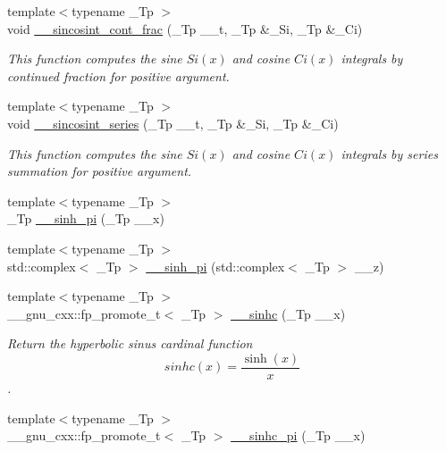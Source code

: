 \begin{DoxyCompactItemize}
{\footnotesize template$<$typename \+\_\+\+Tp $>$ }\\void \hyperlink{namespacestd_1_1____detail_a211f552bca2944f64e3a1f5593690fda}{\+\_\+\+\_\+sincosint\+\_\+cont\+\_\+frac} (\+\_\+\+Tp \+\_\+\+\_\+t, \+\_\+\+Tp \&\+\_\+\+Si, \+\_\+\+Tp \&\+\_\+\+Ci)
\begin{DoxyCompactList}\small\item\em This function computes the sine $ Si(x) $ and cosine $ Ci(x) $ integrals by continued fraction for positive argument. \end{DoxyCompactList}\item 
{\footnotesize template$<$typename \+\_\+\+Tp $>$ }\\void \hyperlink{namespacestd_1_1____detail_aea85e0044476065ed4a067f1aa9647cb}{\+\_\+\+\_\+sincosint\+\_\+series} (\+\_\+\+Tp \+\_\+\+\_\+t, \+\_\+\+Tp \&\+\_\+\+Si, \+\_\+\+Tp \&\+\_\+\+Ci)
\begin{DoxyCompactList}\small\item\em This function computes the sine $ Si(x) $ and cosine $ Ci(x) $ integrals by series summation for positive argument. \end{DoxyCompactList}\item 
{\footnotesize template$<$typename \+\_\+\+Tp $>$ }\\\+\_\+\+Tp \hyperlink{namespacestd_1_1____detail_a6dd7153012cc7885e76a47a5162981da}{\+\_\+\+\_\+sinh\+\_\+pi} (\+\_\+\+Tp \+\_\+\+\_\+x)
\item 
{\footnotesize template$<$typename \+\_\+\+Tp $>$ }\\std\+::complex$<$ \+\_\+\+Tp $>$ \hyperlink{namespacestd_1_1____detail_aa8fe06b3d9584ea9c81b0349ba7eb2dc}{\+\_\+\+\_\+sinh\+\_\+pi} (std\+::complex$<$ \+\_\+\+Tp $>$ \+\_\+\+\_\+z)
\item 
{\footnotesize template$<$typename \+\_\+\+Tp $>$ }\\\+\_\+\+\_\+gnu\+\_\+cxx\+::fp\+\_\+promote\+\_\+t$<$ \+\_\+\+Tp $>$ \hyperlink{namespacestd_1_1____detail_a65db661ebfae979e916e2f4481e6866c}{\+\_\+\+\_\+sinhc} (\+\_\+\+Tp \+\_\+\+\_\+x)
\begin{DoxyCompactList}\small\item\em Return the hyperbolic sinus cardinal function \[ sinhc(x) = \frac{\sinh(x)}{x} \]. \end{DoxyCompactList}\item 
{\footnotesize template$<$typename \+\_\+\+Tp $>$ }\\\+\_\+\+\_\+gnu\+\_\+cxx\+::fp\+\_\+promote\+\_\+t$<$ \+\_\+\+Tp $>$ \hyperlink{namespacestd_1_1____detail_a3478d06aa615f1efb0fd86fd4eb59195}{\+\_\+\+\_\+sinhc\+\_\+pi} (\+\_\+\+Tp \+\_\+\+\_\+x)

\end{DoxyCompactItemize}
